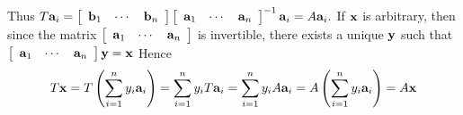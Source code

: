 \begin{enumialphparenastyle}
\begin{ex}
\begin{sol}
Thus $T{\bf a}_{i}=\left[
\begin{array}{ccc}
{\bf b}_{1} & \cdots & {\bf b}_{n}
\end{array}
\right] \left[
\begin{array}{ccc}
{\bf a}_{1} & \cdots & {\bf a}_{n}
\end{array}
\right] ^{-1}{\bf a}_{i} =  A{\bf a}_{i}.$ If ${\bf x}$ is
arbitrary, then since the matrix $\left[
\begin{array}{ccc}
{\bf a}_{1} & \cdots & {\bf a}_{n}
\end{array}
\right] $ is invertible, there exists a unique ${\bf y}$ such that $
\left[
\begin{array}{ccc}
{\bf a}_{1} & \cdots & {\bf a}_{n}
\end{array}
\right] {\bf y}={\bf x}$ Hence
\[
T{\bf x}=T\left( \sum_{i=1}^{n}y_{i}{\bf a}_{i}\right)
=\sum_{i=1}^{n}y_{i}T{\bf a}_{i}=\sum_{i=1}^{n}y_{i}A{\bf a}
_{i}=A\left( \sum_{i=1}^{n}y_{i}{\bf a}_{i}\right) =A{\bf x}
\]

\end{sol}
\end{ex}


\end{enumialphparenastyle}
